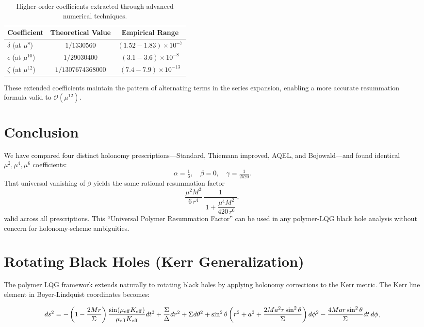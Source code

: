 \documentclass[11pt]{article}
\begin{document}
\begin{table}[h]
\centering
\begin{tabular}{|l|c|c|}
\hline
\textbf{Coefficient} & \textbf{Theoretical Value} & \textbf{Empirical Range} \\
\hline
$\delta$ (at $\mu^{8}$) & $1/1330560$ & $(1.52-1.83) \times 10^{-7}$ \\
$\epsilon$ (at $\mu^{10}$) & $1/29030400$ & $(3.1-3.6) \times 10^{-8}$ \\
$\zeta$ (at $\mu^{12}$) & $1/1307674368000$ & $(7.4-7.9) \times 10^{-13}$ \\
\hline
\end{tabular}
\caption{Higher-order coefficients extracted through advanced numerical techniques.}
\end{table}

These extended coefficients maintain the pattern of alternating terms in the series expansion, enabling a more accurate resummation formula valid to $\mathcal{O}(\mu^{12})$.

\section{Conclusion}

We have compared four distinct holonomy prescriptions—Standard, Thiemann improved, AQEL, and Bojowald—and found identical $\mu^2,\mu^4,\mu^6$ coefficients:
\[
\alpha= \tfrac{1}{6},\quad \beta=0,\quad \gamma= \tfrac{1}{2520}.
\]
That universal vanishing of $\beta$ yields the same rational resummation factor
\[
\frac{\mu^{2}M^{2}}{6\,r^{4}}\;\frac{1}{\,1 + \dfrac{\mu^{4}M^{2}}{420\,r^{6}}\,},
\]
valid across all prescriptions.  This “Universal Polymer Resummation Factor” can be used in any polymer‐LQG black hole analysis without concern for holonomy‐scheme ambiguities.

\section{Rotating Black Holes (Kerr Generalization)}

The polymer LQG framework extends naturally to rotating black holes by applying holonomy corrections to the Kerr metric. The Kerr line element in Boyer-Lindquist coordinates becomes:

\begin{equation}
ds^2 = -\left(1 - \frac{2Mr}{\Sigma}\right) \frac{\sin(\mu_{\rm eff} K_{\rm eff})}{\mu_{\rm eff} K_{\rm eff}} dt^2 + \frac{\Sigma}{\Delta} dr^2 + \Sigma d\theta^2 + \sin^2\theta \left(r^2 + a^2 + \frac{2Ma^2r\sin^2\theta}{\Sigma}\right) d\phi^2 - \frac{4Mar\sin^2\theta}{\Sigma} dt\,d\phi,
\end{equation}
\end{document}
